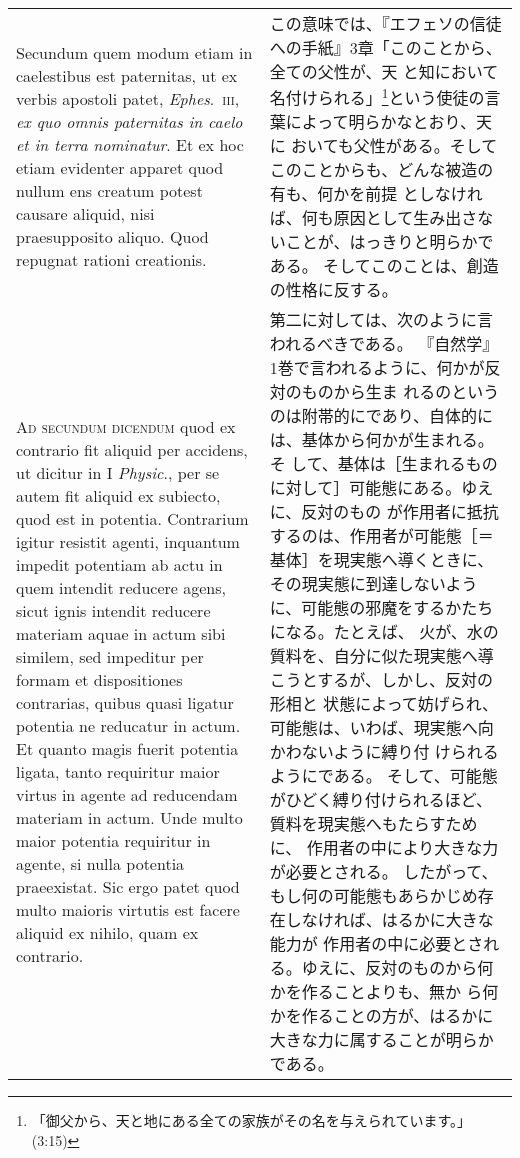 \documentclass[10pt]{jsarticle} %
\begin{document}
\begin{longtable}{p{21em}p{21em}}
Secundum quem modum etiam in caelestibus est paternitas, ut ex verbis
 apostoli patet, {\itshape Ephes}.~{\scshape iii}, {\itshape ex quo
 omnis paternitas in caelo et in terra nominatur}. Et ex hoc etiam
 evidenter apparet quod nullum ens creatum potest causare aliquid, nisi
 praesupposito aliquo. Quod repugnat rationi creationis.

&

この意味では、『エフェソの信徒への手紙』3章「このことから、全ての父性が、天
 と知において名付けられる」\footnote{「御父から、天と地にある全ての家族がその名を与えられています。」(3:15)}という使徒の言葉によって明らかなとおり、天に
 おいても父性がある。そしてこのことからも、どんな被造の有も、何かを前提
 としなければ、何も原因として生み出さないことが、はっきりと明らかである。
 そしてこのことは、創造の性格に反する。

\\



{\scshape Ad secundum dicendum} quod ex contrario fit aliquid per
 accidens, ut dicitur in I {\itshape Physic}., per se autem fit aliquid
 ex subiecto, quod est in potentia. Contrarium igitur resistit agenti,
 inquantum impedit potentiam ab actu in quem intendit reducere agens,
 sicut ignis intendit reducere materiam aquae in actum sibi similem, sed
 impeditur per formam et dispositiones contrarias, quibus quasi ligatur
 potentia ne reducatur in actum. Et quanto magis fuerit potentia ligata,
 tanto requiritur maior virtus in agente ad reducendam materiam in
 actum. Unde multo maior potentia requiritur in agente, si nulla
 potentia praeexistat. Sic ergo patet quod multo maioris virtutis est
 facere aliquid ex nihilo, quam ex contrario.

&

第二に対しては、次のように言われるべきである。
『自然学』1巻で言われるように、何かが反対のものから生ま
 れるのというのは附帯的にであり、自体的には、基体から何かが生まれる。そ
 して、基体は［生まれるものに対して］可能態にある。ゆえに、反対のもの
 が作用者に抵抗するのは、作用者が可能態［＝基体］を現実態へ導くときに、
 その現実態に到達しないように、可能態の邪魔をするかたちになる。たとえば、
 火が、水の質料を、自分に似た現実態へ導こうとするが、しかし、反対の形相と
 状態によって妨げられ、可能態は、いわば、現実態へ向かわないように縛り付
 けられるようにである。
そして、可能態がひどく縛り付けられるほど、質料を現実態へもたらすために、
 作用者の中により大きな力が必要とされる。
したがって、もし何の可能態もあらかじめ存在しなければ、はるかに大きな能力が
 作用者の中に必要とされる。ゆえに、反対のものから何かを作ることよりも、無か
 ら何かを作ることの方が、はるかに大きな力に属することが明らかである。


\end{longtable}
\end{document}
